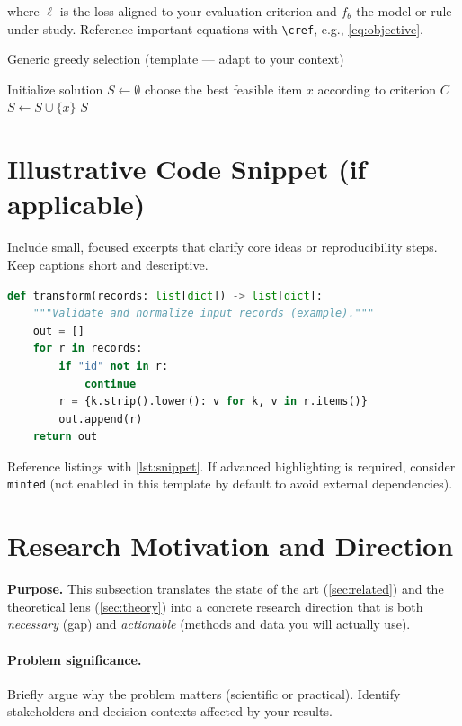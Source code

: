 where $\ell$ is the loss aligned to your evaluation criterion and $f_\theta$ the model or rule under study. Reference important equations with \verb|\cref|, e.g., \cref{eq:objective}.

\begin{algorithm}[h]
\caption{Generic greedy selection (template — adapt to your context)}
\begin{algorithmic}[1]
  \State Initialize solution $S \gets \emptyset$
    \State choose the best feasible item $x$ according to criterion $C$
    \State $S \gets S \cup \{x\}$
  \EndWhile
  \State \Return $S$
\end{algorithmic}
\label{alg:example}
\end{algorithm}

\section{Illustrative Code Snippet (if applicable)}
\label{sec:listings}
Include small, focused excerpts that clarify core ideas or reproducibility steps. Keep captions short and descriptive.

\begin{lstlisting}[language=Python,caption={Example function signature for a data transform},label={lst:snippet},float=htbp]
def transform(records: list[dict]) -> list[dict]:
    """Validate and normalize input records (example)."""
    out = []
    for r in records:
        if "id" not in r:
            continue
        r = {k.strip().lower(): v for k, v in r.items()}
        out.append(r)
    return out
\end{lstlisting}

Reference listings with \cref{lst:snippet}. If advanced highlighting is required, consider \texttt{minted} (not enabled in this template by default to avoid external dependencies).

\section{Research Motivation and Direction}
\label{sec:motivation}
\textbf{Purpose.} This subsection translates the state of the art (\cref{sec:related}) and the theoretical lens (\cref{sec:theory}) into a concrete research direction that is both \emph{necessary} (gap) and \emph{actionable} (methods and data you will actually use).

\paragraph{Problem significance.}
Briefly argue why the problem matters (scientific or practical). Identify stakeholders and decision contexts affected by your results.

